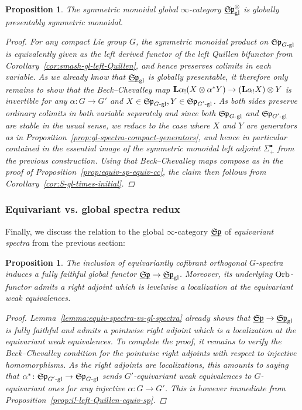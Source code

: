 \documentclass[reqno]{memo-l}
\theoremstyle{mythm}
\newtheorem{prop}[thm]{Proposition}
\theoremstyle{definition}
\numberwithin{equation}{section}
\newcommand{\gl}{\textup{gl}}
\newcommand{\cat}[1]{\textbf{\textup{#1}}}
\newcommand{\Orb}{{\vphantom{\textup{t}}\smash{\textup{Orb}}}}
\newcommand{\ulhelper}[2]{\underline{\setbox0=\hbox{$#1#2$}\dp0=0.4pt \box0\relax}}
\newcommand{\ul}[1]{{\mathpalette\ulhelper{#1}}\hbox{\rule[-2pt]{0pt}{0pt}}}
\newcommand{\mySp}{{\mathfrak S\kern-.5pt\mathfrak p}}
\begin{document}
\begin{prop}\label{prop:gl-spectra-pres-sym-mon}
    The symmetric monoidal global $\infty$-category $\ul\mySp_\gl^\otimes$ is globally presentably symmetric monoidal.
    \begin{proof}
        For any compact Lie group $G$, the symmetric monoidal product on $\mySp_\text{$G$-gl}$ is equivalently given as the left derived functor of the left Quillen bifunctor from Corollary~\ref{cor:smash-gl-left-Quillen}, and hence preserves colimits in each variable. As we already know that $\ul\mySp_\gl$ is globally presentable, it therefore only remains to show that the Beck--Chevalley map $\cat{L}\alpha_!(X\otimes \alpha^*Y)\to(\cat{L}\alpha_!X)\otimes Y$ is invertible for any $\alpha\colon G\to G'$ and $X\in\mySp_\text{$G$-gl},Y\in\mySp_\text{$G'$-gl}$. As both sides preserve ordinary colimits in both variable separately and since both $\mySp_\text{$G$-gl}$ and $\mySp_\text{$G'$-gl}$ are stable in the usual sense, we reduce to the case where $X$ and $Y$ are generators as in Proposition~\ref{prop:gl-spectra-compact-generators}, and hence in particular contained in the essential image of the symmetric monoidal left adjoint $\Sigma^\bullet_+$ from the previous construction. Using that Beck--Chevalley maps compose as in the proof of Proposition~\ref{prop:equiv-sp-equiv-cc}, the claim then follows from Corollary~\ref{cor:S-gl-times-initial}.
    \end{proof}
\end{prop}

\subsubsection{Equivariant vs. global spectra redux} Finally, we discuss the relation to the global $\infty$-category $\ul\mySp$ of \emph{equivariant spectra} from the previous section:

\begin{prop}\label{prop:mySp-vs-mySp-gl}
    The inclusion of equivariantly cofibrant orthogonal $G$-spectra induces a fully faithful global functor $\ul\mySp\to\ul\mySp_\gl$. Moreover, its underlying $\Orb$-functor admits a right adjoint which is levelwise a localization at the equivariant weak equivalences.
    \begin{proof}
        Lemma~\ref{lemma:equiv-spectra-vs-gl-spectra} already shows that $\ul\mySp\to\ul\mySp_\gl$ is fully faithful and admits a pointwise right adjoint which is a localization at the equivariant weak equivalences.
        To complete the proof, it remains to verify the Beck--Chevalley condition for the pointwise right adjoints with respect to \emph{injective} homomorphisms. As the right adjoints are localizations, this amounts to saying that $\alpha^*\colon\mySp_\text{$G'$-gl}\to\mySp_\text{$G$-gl}$ sends $G'$-equivariant weak equivalences to $G$-equivariant ones for any injective $\alpha\colon G\to G'$. This is however immediate from Proposition~\ref{prop:i!-left-Quillen-equiv-sp}.
    \end{proof}
\end{prop}
\end{document}

